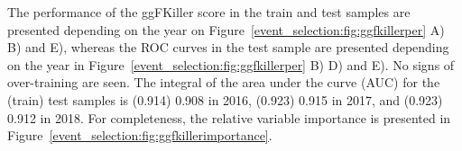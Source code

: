 The performance of the ggFKiller score in the train and test samples are presented depending on the year on Figure~\ref{event_selection:fig:ggfkillerper} A) B) and E), whereas the ROC curves in the test sample are presented depending on the year in Figure~\ref{event_selection:fig:ggfkillerper} B) D) and E). No signs of over-training are seen. The integral of the area under the curve (AUC) for the (train) test samples is (0.914) 0.908 in 2016, (0.923) 0.915 in 2017, and (0.923) 0.912 in 2018. For completeness, the relative variable importance is presented in Figure~\ref{event_selection:fig:ggfkillerimportance}.

\begin{figure}[htbp!]
\captionsetup[subfigure]{justification=centering}
\begin{center}
\\
\end{center}
\end{figure}
